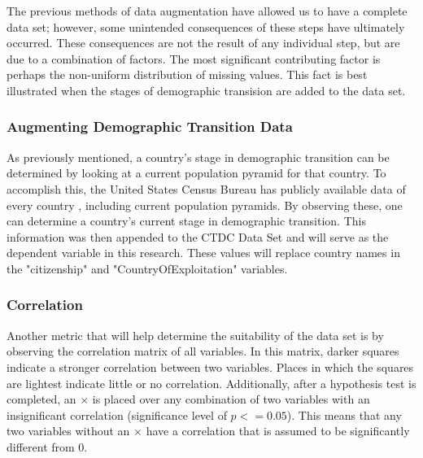 \documentclass{article} %
\begin{document}
The previous methods of data augmentation have allowed us to have a complete data set; however, some unintended consequences of these steps have ultimately occurred. These consequences are not the result of any individual step, but are due to a combination of factors. The most significant contributing factor is perhaps the non-uniform distribution of missing values. This fact is best illustrated when the stages of demographic transision are added to the data set. 

\subsubsection{Augmenting Demographic Transition Data}

As previously mentioned, a country's stage in demographic transition can be determined by looking at a current population pyramid for that country. To accomplish this, the United States Census Bureau has publicly available data of every country \parencite{USCB}, including current population pyramids. By observing these, one can determine a country's current stage in demographic transition. This information was then appended to the CTDC Data Set and will serve as the dependent variable in this research. These values will replace country names in the "citizenship" and "CountryOfExploitation" variables.

\subsubsection{Correlation} \label{Correlation}

Another metric that will help determine the suitability of the data set is by observing the correlation matrix of all variables. In this matrix, darker squares indicate a stronger correlation between two variables. Places in which the squares are lightest indicate little or no correlation. Additionally, after a hypothesis test is completed, an $\times$ is placed over any combination of two variables with an insignificant correlation (significance level of $p <= 0.05$). This means that any two variables without an $\times$ have a correlation that is assumed to be significantly different from 0.
\end{document}
